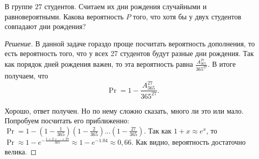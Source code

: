 \begin{problem}
    В группе \(27\) студентов. Считаем их дни рождения случайными и равновероятными. Какова вероятность \(P\) того, что хотя бы у двух студентов совпадают дни рождения?
\end{problem}
\begin{proof}[Решение]
    В данной задаче гораздо проще посчитать вероятность дополнения, то есть вероятность того, что у всех 27 студентов будут разные дни рождения. Так как порядок дней рождения важен, то эта вероятность равна \(\frac{A_{365}^{27}}{365^{27}}\). В итоге получаем, что \[\Pr = 1 - \frac{A_{365}^{27}}{365^{27}}.\]
    
    Хорошо, ответ получен. Но по нему сложно сказать, много ли это или мало. Попробуем посчитать его приближенно: \(\Pr = 1 - \left(1 - \frac{1}{365}\right)\left(1 - \frac{2}{365}\right)\ldots\left(1 - \frac{27}{365}\right)\). Так как \(1 + x \approx e^x\), то \(\Pr \approx 1 - e^{-\frac{1 + 2 + \ldots + 27}{365}} \approx 1 - e^{-1.04} \approx 0,66\). Как видно, вероятность достаточно велика.
\end{proof}

